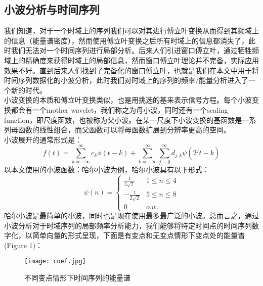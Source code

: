 \documentclass{ctexart}
\begin{document}
\subsection{小波分析与时间序列}
我们知道，对于一个时域上的序列我们可以对其进行傅立叶变换从而得到其频域上的信息（能量谱密度），然而使用傅立叶变换之后所有时域上的信息都消失了，此时我们无法对一个时间序列进行局部分析。后来人们引进窗口傅立叶，通过牺牲频域上的精确度来获得时域上的局部信息，然而窗口傅立叶理论并不完备，实际应用效果不好。直到后来人们找到了完备化的窗口傅立叶，也就是我们在本文中用于将时间序列数据化的小波分析，此时我们对时域上的序列的频率/能量分析进入了一个新的时代。\\
小波变换的本质和傅立叶变换类似，也是用挑选的基来表示信号方程。每个小波变换都会有一个mother wavelet，我们称之为母小波，同时还有一个scaling function，即尺度函数，也被称为父小波。在某一尺度下小波变换的基函数是一系列母函数的线性组合，而父函数可以将母函数扩展到分辨率更高的空间。\\
小波展开的通常形式是：
\begin{equation}
  f(t)=\sum_{k=-\infty}^\infty c_k\phi(t-k)+\sum_{k=-\infty}^\infty \sum_{j=0}^\infty d_{j,k}\psi(2^jt-k)
\end{equation}
以本文使用的小波函数：哈尔小波为例，哈尔小波具有以下形式：
\begin{equation}
   \psi(n)=
   \begin{cases}
    \frac{1}{2\sqrt{2}} &1\leq n\leq4\\
    -\frac{1}{2\sqrt{2}} &5\leq n\le8\\
    0 &o.w.
   \end{cases}
\end{equation}
哈尔小波是最简单的小波，同时也是现在使用最多最广泛的小波。总而言之，通过小波分析对于时域序列的局部频率分析能力，我们能够将特定时间点的时间序列数字化，以简单向量的形式呈现，下面是有变点和无变点情形下变点处的能量谱(Figure 1)：
\begin{figure}
  \centering
  \texttt{[image: coef.jpg]}
  \caption{不同变点情形下时间序列的能量谱}
\end{figure}
\end{document}
